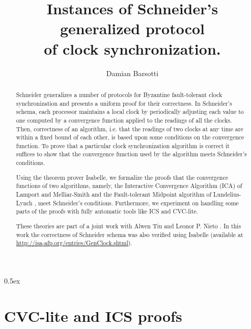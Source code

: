 \documentclass[11pt,a4paper]{article}
\begin{document}
\title{Instances of Schneider's generalized protocol\\
       of clock synchronization.}

\author{Damian Barsotti}
\maketitle

\begin{abstract}\noindent  
  Schneider \cite{schneider87understanding} generalizes a number of
  protocols for Byzantine fault-tolerant clock synchronization and
  presents a uniform proof for their correctness. In Schneider's
  schema, each processor maintains a local clock by periodically
  adjusting each value to one computed by a convergence function
  applied to the readings of all the clocks. Then, correctness of an
  algorithm, i.e. that the readings of two clocks at any time are
  within a fixed bound of each other, is based upon some conditions on
  the convergence function. To prove that a particular clock
  synchronization algorithm is correct it suffices to show that the
  convergence function used by the algorithm meets Schneider's
  conditions.

  Using the theorem prover Isabelle, we formalize the proofs that the
  convergence functions of two algorithms, namely, the Interactive
  Convergence Algorithm (ICA) of Lamport and Melliar-Smith
  \cite{lamport_cs} and the Fault-tolerant Midpoint algorithm of
  Lundelius-Lynch \cite{lynch_cs}, meet Schneider's conditions.
  Furthermore, we experiment on handling some parts of the proofs with
  fully automatic tools like ICS\cite{ics} and \mbox{CVC-lite}\cite{cvclite}.

  These theories are part of a joint work with Alwen Tiu and Leonor
  P. Nieto \cite{bars_leon_tiu}. In this work the correctness of
  Schneider schema was also verified using Isabelle (available at
  \url{http://isa-afp.org/entries/GenClock.shtml}).

\end{abstract}

\tableofcontents

\parindent 0pt\parskip 0.5ex



\appendix

\section{CVC-lite and ICS proofs}
\end{document}
